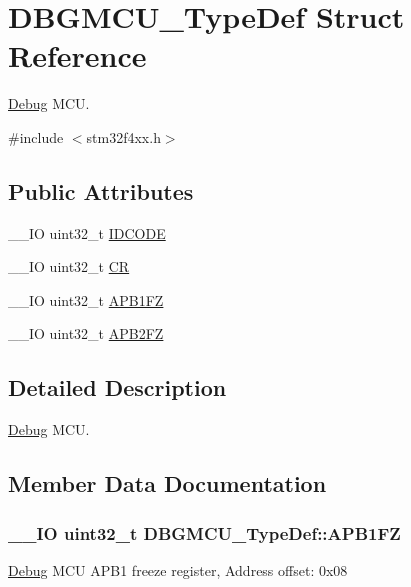 \hypertarget{struct_d_b_g_m_c_u___type_def}{}\section{D\+B\+G\+M\+C\+U\+\_\+\+Type\+Def Struct Reference}
\label{struct_d_b_g_m_c_u___type_def}


\hyperlink{class_debug}{Debug} M\+C\+U.  




{\ttfamily \#include $<$stm32f4xx.\+h$>$}

\subsection*{Public Attributes}
\begin{DoxyCompactItemize}
\item 
\+\_\+\+\_\+\+I\+O uint32\+\_\+t \hyperlink{struct_d_b_g_m_c_u___type_def_a0cc3561c124d06bb57dfa855e43ed99f}{I\+D\+C\+O\+D\+E}
\item 
\+\_\+\+\_\+\+I\+O uint32\+\_\+t \hyperlink{struct_d_b_g_m_c_u___type_def_a15981828f2b915d38570cf6684e99a53}{C\+R}
\item 
\+\_\+\+\_\+\+I\+O uint32\+\_\+t \hyperlink{struct_d_b_g_m_c_u___type_def_aac341c7e09cd5224327eeb7d9f122bed}{A\+P\+B1\+F\+Z}
\item 
\+\_\+\+\_\+\+I\+O uint32\+\_\+t \hyperlink{struct_d_b_g_m_c_u___type_def_a011f892d86367dbe786964b14bc515a6}{A\+P\+B2\+F\+Z}
\end{DoxyCompactItemize}


\subsection{Detailed Description}
\hyperlink{class_debug}{Debug} M\+C\+U. 

\subsection{Member Data Documentation}
\hypertarget{struct_d_b_g_m_c_u___type_def_aac341c7e09cd5224327eeb7d9f122bed}{}
\subsubsection[{A\+P\+B1\+F\+Z}]{\setlength{\rightskip}{0pt plus 5cm}\+\_\+\+\_\+\+I\+O uint32\+\_\+t D\+B\+G\+M\+C\+U\+\_\+\+Type\+Def\+::\+A\+P\+B1\+F\+Z}\label{struct_d_b_g_m_c_u___type_def_aac341c7e09cd5224327eeb7d9f122bed}
\hyperlink{class_debug}{Debug} M\+C\+U A\+P\+B1 freeze register, Address offset\+: 0x08 \hypertarget{struct_d_b_g_m_c_u___type_def_a011f892d86367dbe786964b14bc515a6}{}
